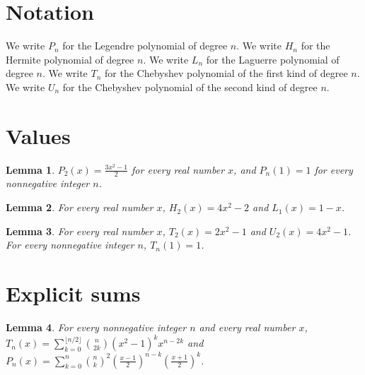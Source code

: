 \documentclass{article}
\newtheorem{lemma}{Lemma}
\begin{document}
\section{Notation}

We write $P_n$ for the Legendre polynomial of degree $n$.
We write $H_n$ for the Hermite polynomial of degree $n$.
We write $L_n$ for the Laguerre polynomial of degree $n$.
We write $T_n$ for the Chebyshev polynomial of the first kind of degree $n$.
We write $U_n$ for the Chebyshev polynomial of the second kind of degree $n$.

\section{Values}

\begin{lemma}\label{legendre}
$P_2(x)=\frac{3x^2-1}{2}$ for every real number $x$, and $P_n(1)=1$ for every nonnegative integer $n$.
\end{lemma}

\begin{lemma}\label{hermite}
For every real number $x$, $H_2(x)=4x^2-2$ and $L_1(x)=1-x$.
\end{lemma}

\begin{lemma}\label{chebyshev}
For every real number $x$, $T_2(x)=2x^2-1$ and $U_2(x)=4x^2-1$. For every nonnegative integer $n$, $T_n(1)=1$.
\end{lemma}

\section{Explicit sums}

\begin{lemma}\label{sums}
For every nonnegative integer $n$ and every real number $x$, $T_n(x)=\sum_{k=0}^{\lfloor n/2\rfloor}\binom{n}{2k}(x^2-1)^kx^{n-2k}$ and $P_n(x)=\sum_{k=0}^{n}\binom{n}{k}^2(\frac{x-1}{2})^{n-k}(\frac{x+1}{2})^k$.
\end{lemma}
\end{document}
